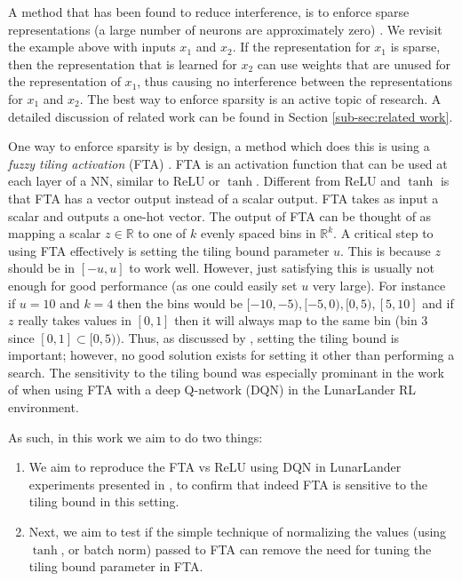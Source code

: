 \documentclass{article}
\newcommand{\RR}{\mathbb{R}}
\begin{document}
A method that has been found to reduce interference, is to enforce sparse representations (a large number of neurons are approximately zero) \cite[]{liu2019,javed2019,rafati2019learning}.
We revisit the example above with inputs $x_1$ and $x_2$.
If the representation for $x_1$ is sparse, then the representation that is learned for $x_2$ can use weights that are unused for the representation of $x_1$,
thus causing no interference between the representations for $x_1$ and $x_2$.
The best way to enforce sparsity is an active topic of research.
A detailed discussion of related work can be found in Section \ref{sub-sec:related work}.

One way to enforce sparsity is by design, a method which does this is using a \textit{fuzzy tiling activation} (FTA) \cite[]{pan2019fuzzy}.
FTA is an activation function that can be used at each layer of a NN, similar to ReLU or $\tanh$.
Different from ReLU and $\tanh$ is that FTA has a vector output instead of a scalar output.
FTA takes as input a scalar and outputs a one-hot vector.
The output of FTA can be thought of as mapping a scalar $z \in \RR$ to one of $k$ evenly spaced bins in $\RR^k$.
A critical step to using FTA effectively is setting the tiling bound parameter $u$.
This is because $z$ should be in $[-u, u]$ to work well.
However, just satisfying this is usually not enough for good performance (as one could easily set $u$ very large).
For instance if $u = 10$ and $k = 4$ then the bins would be $[-10, -5), [-5, 0), [0, 5), [5, 10]$
and if $z$ really takes values in $[0,1]$ then it will always map to the same bin (bin $3$ since $[0, 1] \subset [0, 5))$.
Thus, as discussed by \cite[]{pan2019fuzzy}, setting the tiling bound is important; however, no good solution exists for setting it other than performing a search.
The sensitivity to the tiling bound was especially prominant in the work of \cite[]{pan2019fuzzy} when using FTA with a deep Q-network (DQN) \cite[]{mnih2013playing} in the LunarLander RL environment.

As such, in this work we aim to do two things:
\begin{enumerate}
  \item We aim to reproduce the FTA vs ReLU using DQN in LunarLander experiments presented in \cite[]{pan2019fuzzy}, to confirm that indeed FTA is sensitive to the tiling bound in this setting.
  \item Next, we aim to test if the simple technique of normalizing the values (using $\tanh$, or batch norm) passed to FTA can remove the need for tuning the tiling bound parameter in FTA.
\end{enumerate}
\end{document}
